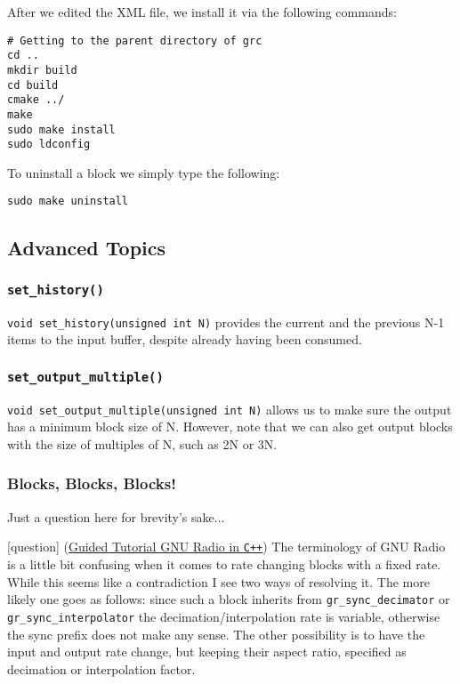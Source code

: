 \documentclass{article}
\begin{document}
After we edited the XML file, we install it via the following commands:

\begin{verbatim}
# Getting to the parent directory of grc
cd ..
mkdir build
cd build
cmake ../
make
sudo make install
sudo ldconfig
\end{verbatim}

To uninstall a block we simply type the following:
\begin{verbatim}
sudo make uninstall
\end{verbatim}

\subsection{Advanced Topics}

\subsubsection{\texttt{set\_history()}}

\texttt{void set_history(unsigned int N)} provides the current and the previous N-1 items to the input buffer, despite already having been consumed.

\subsubsection{\texttt{set\_output\_multiple()}}

\texttt{void set_output_multiple(unsigned int N)} allows us to make sure the output has a minimum block size of N. However, note that we can also get output blocks with the size of multiples of N, such as 2N or 3N.

\subsubsection{Blocks, Blocks, Blocks!}

Just a question here for brevity's sake...

\bigskip

\color{blue}
[question] (\href{https://wiki.gnuradio.org/index.php/Guided\_Tutorial\_GNU\_Radio\_in\_C\%2B\%2B}{Guided Tutorial GNU Radio in \texttt{C++}}) The terminology of GNU Radio is a little bit confusing when it comes to rate changing blocks with a fixed rate. While this seems like a contradiction I see two ways of resolving it. The more likely one goes as follows: since such a block inherits from \texttt{gr\_sync\_decimator} or \texttt{gr\_sync\_interpolator} the decimation/interpolation rate is variable, otherwise the sync prefix does not make any sense. The other possibility is to have the input and output rate change, but keeping their aspect ratio, specified as decimation or interpolation factor. 
\color{black}
\end{document}
